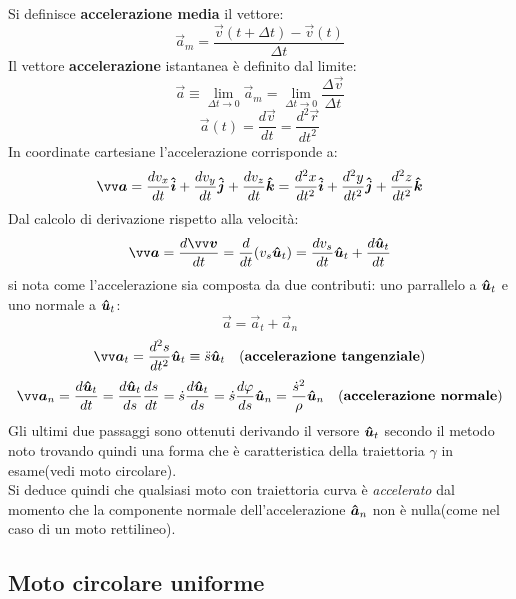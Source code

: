 Si definisce \textbf{accelerazione media} il vettore:
\[
    \vec{a}_m = \frac{\vec{v}(t + \Delta t)-\vec{v}(t)}{\Delta t}      
\]
Il vettore \textbf{accelerazione} istantanea è definito dal limite:
\[
    \vec{a} \equiv \lim_{\Delta t \to 0} \vec{a}_m = \lim_{\Delta t \to 0} \frac{\Delta \vec{v}}{\Delta t}      
\]
\[
 \vec{a}(t) = \frac{d \vec{v}}{dt} = \frac{d^2\vec{r}}{dt^2}    
\]
In coordinate cartesiane l'accelerazione corrisponde a:
\[
    \vec{a} =  \frac{dv_x}{dt} \v{i} + \frac{dv_y}{dt} \v{j} + \frac{dv_z}{dt} \v{k}
    = \frac{d^2x}{dt^2} \v{i} + \frac{d^2y}{dt^2} \v{j} + \frac{d^2z}{dt^2} \v{k}
\]
Dal calcolo di derivazione rispetto alla velocità:
\[
    \vec{a} = \frac{d \vec{v}}{dt} = \frac{d}{dt} (v_s \v{u}_t) = \frac{dv_s}{dt}\v{u}_t
    + \frac{d\v{u}_t}{dt}
\]
si nota come l'accelerazione sia composta da due contributi: uno parrallelo a $\boldsymbol{\hat{u}}_t$ e uno normale a 
$\boldsymbol{\hat{u}}_t$:
\[
 \vec{a} = \vec{a}_t + \vec{a}_n   
\]
\[
 \vec{a}_t = \frac{d^2 s}{dt^2} \v{u}_t \equiv \ddot{s} \v{u}_t \quad (\textbf{accelerazione tangenziale})
\]
\[
    \vec{a}_n = \frac{d\v{u}_t}{dt} = \frac{d\v{u}_t}{ds} \frac{ds}{dt} = \dot{s}\frac{d\v{u}_t}{ds}
    = \dot{s}\frac{d \varphi}{ds}\v{u}_n = \frac{\dot{s}^2}{\rho}\v{u}_n \quad (\textbf{accelerazione normale})    
\]
Gli ultimi due passaggi sono ottenuti derivando il versore $\boldsymbol{\hat{u}}_t$ secondo il metodo noto trovando quindi una
forma che è caratteristica della traiettoria $\gamma$ in esame(vedi moto circolare). \\
Si deduce quindi che qualsiasi moto con traiettoria curva è \emph{accelerato} dal momento che la componente normale
dell'accelerazione $\boldsymbol{\hat{a}}_n$ non è nulla(come nel caso di un moto rettilineo).
\subsection*{Moto circolare uniforme}
\label{cinem: circ-unif}